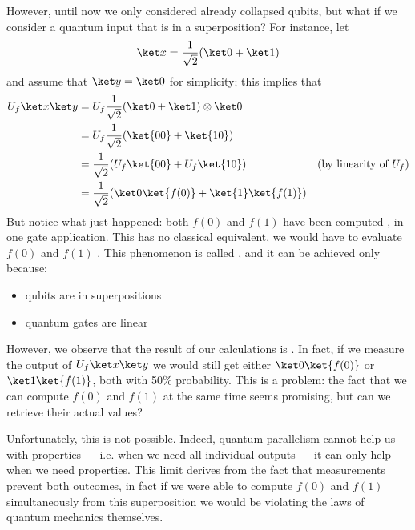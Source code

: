 \documentclass[a4paper, 12pt]{report}
\begin{document}
However, until now we only considered already collapsed qubits, but what if we consider a quantum input that is in a superposition? For instance, let $$\ket x = \dfrac{1}{\sqrt 2}(\ket 0 + \ket 1)$$ and assume that $\ket y = \ket 0$ for simplicity; this implies that
\begin{equation*}
    \begin{alignedat}{2}
        U_f \ket x \ket y & = U_f \dfrac{1}{\sqrt 2}(\ket 0 + \ket 1) \otimes \ket 0 & \\ 
                          & = U_f \dfrac{1}{\sqrt 2}(\ket{00} + \ket{10}) & \\ 
                          & = \dfrac{1}{\sqrt 2}(U_f \ket {00} + U_f \ket {10}) & \quad (\mbox{by linearity of $U_f$}) \\ 
                          & = \dfrac{1}{\sqrt 2}(\ket 0 \ket{f(0)} + \ket{1} \ket{f(1)}) & \\ 
    \end{alignedat}
\end{equation*}
But notice what just happened: both $f(0)$ and $f(1)$ have been computed , in one gate application. This has no classical equivalent, we would have to evaluate $f(0)$ and $f(1)$ . This phenomenon is called , and it can be achieved only because:

\begin{itemize}
    \item qubits are in superpositions
    \item quantum gates are linear
\end{itemize}

However, we observe that the result of our calculations is . In fact, if we measure the output of $U_f \ket x \ket y$ we would still get either $\ket 0 \ket{f(0)}$ or $\ket 1 \ket {f(1)}$, both with 50\% probability. This is a problem: the fact that we can compute $f(0)$ and $f(1)$ at the same time seems promising, but can we retrieve their actual values?

Unfortunately, this is not possible. Indeed, quantum parallelism cannot help us with  properties --- i.e. when we need all individual outputs --- it can only help when we need  properties. This limit derives from the fact that measurements prevent  both outcomes, in fact if we were able to compute $f(0)$ and $f(1)$ simultaneously from this superposition we would be violating the laws of quantum mechanics themselves.
\end{document}
